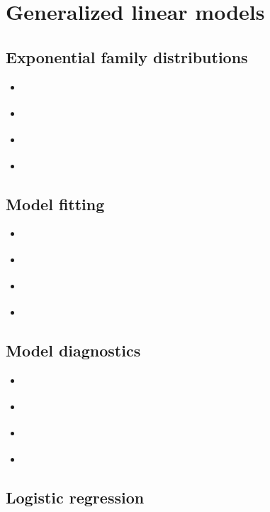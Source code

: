 \documentclass{report}
\begin{document}
\section{Generalized linear models}\label{sec:reading-glm}

\subsection{Exponential family distributions}

\begin{itemize}
    \item \cite[Chapter~3.2]{dobson_introduction_2018}
    \item \cite[Chapter~8.1]{faraway_extending_2016}
    \item \cite[Chapter~4.1]{agresti_foundations_2015}
    \item \cite[Chapter~2.3]{hardin_generalized_2018}
\end{itemize}

\subsection{Model fitting}

\begin{itemize}
    \item \cite[Chapter~8.2]{faraway_extending_2016}
    \item \cite[Chapter~2]{dobson_introduction_2018}
    \item \cite[Chapter~4.5]{agresti_foundations_2015}
    \item \cite[Chapter~3]{hardin_generalized_2018}
\end{itemize}

\subsection{Model diagnostics}

\begin{itemize}
    \item \cite[Chapter~8.4]{faraway_extending_2016}
    \item \cite[Chapter~6.9]{wakefield_bayesian_2013}
    \item \cite[Chapter~4.4]{agresti_foundations_2015}
    \item \cite[Chapter~4]{hardin_generalized_2018}
\end{itemize}

\subsection{Logistic regression}
\end{document}
